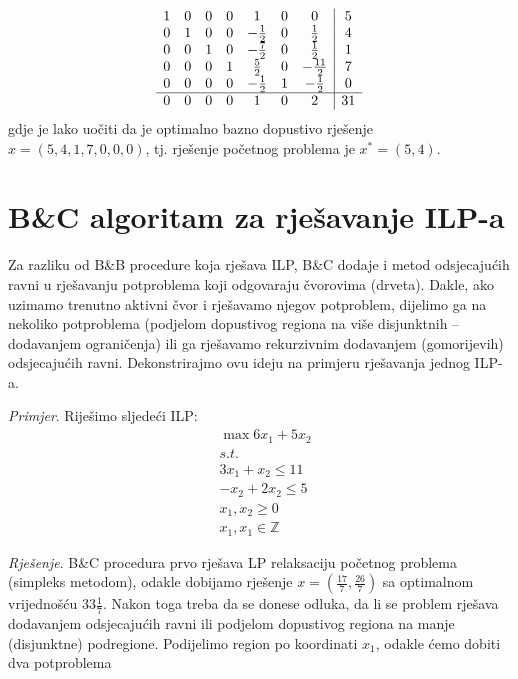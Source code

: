 \documentclass[a4paper, utf8, 11pt, colorlinks]{book}
\begin{document}
$$ \begin{array}{ccccccc| c}
    1    &   0   &   0   &  0 &  1  &   0    &    0    & 5  \\
0    &   1   &   0   &  0   &   -\frac{1}{2}    &   0   & \frac{1}{2} & 4 \\
0    &   0   &   1   &  0   &   -\frac{7}{2}    &   0   & \frac{1}{2} & 1 \\
0    &   0   &   0   &  1  &   \frac{5}{2}    &  0 &  -\frac{11}{2}    & 7 \\ 
0    &   0   &   0   &   0 &  -\frac{1}{2}    &   1   & - \frac{1}{2} & 0\\ \hline
0    &   0   &   0   &  0  &   1    &    0   & 2 & 31  
\end{array} 
$$
gdje je lako uočiti da je optimalno bazno dopustivo rješenje $x=(5, 4, 1, 7, 0, 0, 0 )$, tj. rješenje početnog problema je $x^*=(5, 4)$.

\section{B\&C algoritam za rješavanje ILP-a}
Za razliku od B\&B procedure koja rješava ILP, B\&C dodaje  i metod odsjecajućih ravni u rješavanju  potproblema koji odgovaraju čvorovima (drveta). Dakle, ako  uzimamo trenutno aktivni čvor i rješavamo njegov potproblem, dijelimo ga na nekoliko potproblema (podjelom dopustivog regiona na više disjunktnih -- dodavanjem ograničenja) ili ga rješavamo rekurzivnim dodavanjem (gomorijevih) odsjecajućih ravni. Dekonstrirajmo ovu ideju na primjeru rješavanja jednog ILP-a.

\emph{Primjer}.  Riješimo sljedeći ILP:
\begin{align*}
    &\max 6 x_1 + 5 x_2 \\
    &  {s.t. } \\
    & 3x_1 + x_2 \leq 11 \\
    & - x_2 + 2 x_2 \leq 5 \\
    & x_1, x_2 \geq 0 \\
    & x_1, x_1 \in \mathbb{Z}
\end{align*}

\emph{Rješenje}. B\&C procedura prvo rješava LP relaksaciju početnog problema (simpleks metodom), odakle dobijamo rješenje $x=(\frac{17}{7}, \frac{26}{7})$
sa optimalnom vrijednošću $33\frac{1}{7}$. Nakon toga treba da se donese odluka, da li se problem rješava dodavanjem odsjecajućih ravni ili podjelom dopustivog regiona na manje (disjunktne) podregione. Podijelimo region po koordinati $x_1$, odakle ćemo dobiti dva potproblema 
\end{document}
